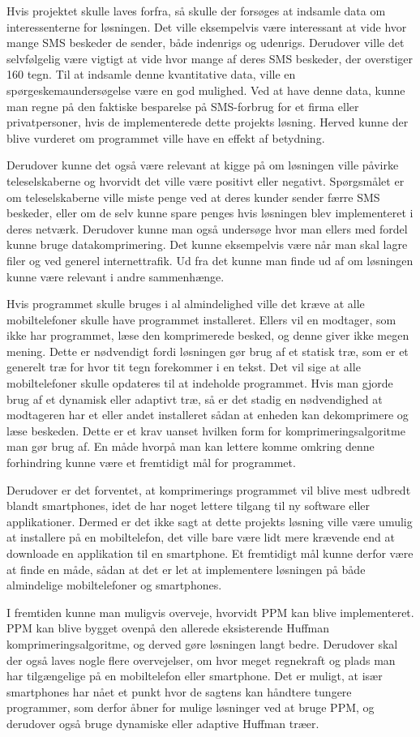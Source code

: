 Hvis projektet skulle laves forfra, så skulle der forsøges at indsamle data om interessenterne for løsningen. Det ville eksempelvis være interessant at vide hvor mange SMS beskeder de sender, både indenrigs og udenrigs. Derudover ville det selvfølgelig være vigtigt at vide hvor mange af deres SMS beskeder, der overstiger 160 tegn. Til at indsamle denne kvantitative data, ville en spørgeskemaundersøgelse være en god mulighed. Ved at have denne data, kunne man regne på den faktiske besparelse på SMS-forbrug for et firma eller privatpersoner, hvis de implementerede dette projekts løsning. Herved kunne der blive vurderet om programmet ville have en effekt af betydning. 

Derudover kunne det også være relevant at kigge på om løsningen ville påvirke teleselskaberne og hvorvidt det ville være positivt eller negativt. Spørgsmålet er om teleselskaberne ville miste penge ved at deres kunder sender færre SMS beskeder, eller om de selv kunne spare penges hvis løsningen blev implementeret i deres netværk. Derudover kunne man også undersøge hvor man ellers med fordel kunne bruge datakomprimering. Det kunne eksempelvis være når man skal lagre filer og ved generel internettrafik. Ud fra det kunne man finde ud af om løsningen kunne være relevant i andre sammenhænge.

Hvis programmet skulle bruges i al almindelighed ville det kræve at alle mobiltelefoner skulle have programmet installeret. Ellers vil en modtager, som ikke har programmet, læse den komprimerede besked, og denne giver ikke megen mening. Dette er nødvendigt fordi løsningen gør brug af et statisk træ, som er et generelt træ for hvor tit tegn forekommer i en tekst. Det vil sige at alle mobiltelefoner skulle opdateres til at indeholde programmet. Hvis man gjorde brug af et dynamisk eller adaptivt træ, så er det stadig en nødvendighed at modtageren har et eller andet installeret sådan at enheden kan dekomprimere og læse beskeden. Dette er et krav uanset hvilken form for komprimeringsalgoritme man gør brug af. En måde hvorpå man kan lettere komme omkring denne forhindring kunne være et fremtidigt mål for programmet.
 
Derudover er det forventet, at komprimerings programmet vil  blive mest udbredt blandt smartphones, idet de har noget lettere tilgang til ny software eller applikationer. Dermed er det ikke sagt at dette projekts løsning ville være umulig at installere på en mobiltelefon, det ville bare være lidt mere krævende end at downloade en applikation til en smartphone. Et fremtidigt mål kunne derfor være at finde en måde, sådan at det er let at implementere løsningen på både almindelige mobiltelefoner og smartphones. 
  
I fremtiden kunne man muligvis overveje, hvorvidt PPM kan blive implementeret. PPM kan blive bygget ovenpå den allerede eksisterende Huffman komprimeringsalgoritme, og derved gøre løsningen langt bedre. Derudover skal der også laves nogle flere overvejelser, om hvor meget regnekraft og plads man har tilgængelige på en mobiltelefon eller smartphone. Det er muligt, at især smartphones har nået et punkt hvor de sagtens kan håndtere tungere programmer, som derfor åbner for mulige løsninger ved at bruge PPM, og derudover også bruge dynamiske eller adaptive Huffman træer.